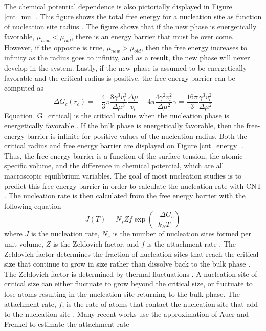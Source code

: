 The chemical potential dependence is also pictorially displayed in Figure \ref{cnt_mu} \cite{Vehkamaki2006}.  This figure shows the total free energy for a nucleation site as function of nucleation site radius \cite{Vehkamaki2006}.  The figure shows that if the new phase is energetically favorable, $\mu_{new} < \mu_{old} $, there is an energy barrier that must be over come.  However, if the opposite is true, $\mu_{new} > \mu_{old}$, then the free energy increases to infinity as the radius goes to infinity, and as a result, the new phase will never develop in the system.  Lastly, if the new phase is assumed to be energetically favorable and the critical radius is positive, the free energy barrier can be computed as
\begin{equation}\label{G_critical}
\Delta G_{c} (r_{c}) = -\frac{4}{3}\pi \frac{8\gamma^3 v_l^3}{\Delta\mu^3}\frac{\Delta\mu}{v_l} + 4\pi\frac{4\gamma^2v_l^2}{\Delta\mu^2}\gamma = \frac{16\pi}{3}\frac{\gamma^3 v_l^2}{\Delta \mu^2}
\end{equation}
Equation \ref{G_critical} is the critical radius when the nucleation phase is energetically favorable \cite{debenedetti1996metastable}.  If the bulk phase is energetically favorable, then the free-energy barrier is infinite for positive values of the nucleation radius.  Both the critical radius and free energy barrier are displayed on Figure \ref{cnt_energy} \cite{debenedetti1996metastable}.  Thus, the free energy barrier is a function of the surface tension, the atomic specific volume, and the difference in chemical potential, which are all macroscopic equilibrium variables.  The goal of most nucleation studies is to predict this free energy barrier in order to calculate the nucleation rate with CNT \cite{debenedetti1996metastable}\cite{Oxtoby1992}.  The nucleation rate is then calculated from the free energy barrier with the following equation
\begin{equation}
J(T) = N_sZf\exp\left(\frac{-\Delta G_c}{k_BT}\right)
\end{equation}
where $J$ is the nucleation rate, $N_s$ is the number of nucleation sites formed per unit volume, $Z$ is the Zeldovich factor, and $f$ is the attachment rate \cite{Vehkamaki2006}\cite{Espinosa2016}.  The Zeldovich factor determines the fraction of nucleation sites that reach the critical size that continue to grow in size rather than dissolve back to the bulk phase \cite{Vehkamaki2006}.  The Zeldovich factor is determined by thermal fluctuations \cite{Vehkamaki2006}.  A nucleation site of critical size can either fluctuate to grow beyond the critical size, or fluctuate to lose atoms resulting in the nucleation site returning to the bulk phase.  The attachment rate, $f$, is the rate of atoms that contact the nucleation site that add to the nucleation site \cite{Auer2001}.  Many recent works use the approximation of Auer and Frenkel to estimate the attachment rate
